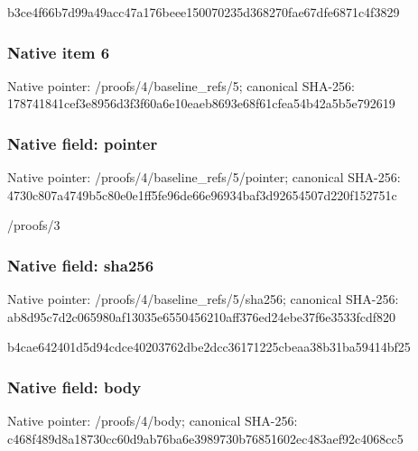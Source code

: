 \documentclass[10pt,a4paper]{article}
\begin{document}
\begingroup\raggedright\sloppy b3ce4f66b7d99a49acc47a176beee150070235d368270fae67dfe6871c4f3829\par\endgroup

\subsubsection{Native item 6}
Native pointer: /proofs/4/baseline\_\allowbreak{}refs/5; canonical SHA-256: 178741841cef3e8956d3f3f60a6e10eaeb8693e68f61cfea54b42a5b5e792619

\subsubsection{Native field: pointer}
Native pointer: /proofs/4/baseline\_\allowbreak{}refs/5/pointer; canonical SHA-256: 4730c807a4749b5c80e0e1ff5fe96de66e96934baf3d92654507d220f152751c

\begingroup\raggedright\sloppy /\allowbreak{}proofs/\allowbreak{}3\par\endgroup

\subsubsection{Native field: sha256}
Native pointer: /proofs/4/baseline\_\allowbreak{}refs/5/sha256; canonical SHA-256: ab8d95c7d2c065980af13035e6550456210aff376ed24ebe37f6e3533fcdf820

\begingroup\raggedright\sloppy b4cae642401d5d94cdce40203762dbe2dcc36171225cbeaa38b31ba59414bf25\par\endgroup

\subsubsection{Native field: body}
Native pointer: /proofs/4/body; canonical SHA-256: c468f489d8a18730cc60d9ab76ba6e3989730b76851602ec483aef92c4068cc5
\end{document}
